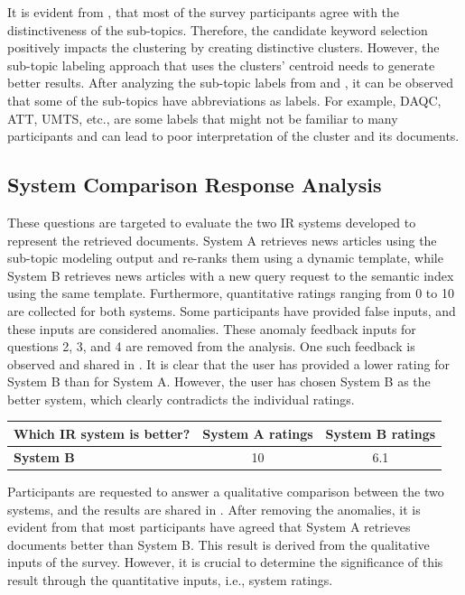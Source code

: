 It is evident from , that most of the survey participants agree with the distinctiveness of the sub-topics. Therefore, the candidate keyword selection positively impacts the clustering by creating distinctive clusters. However, the sub-topic labeling approach that uses the clusters' centroid needs to generate better results. After analyzing the sub-topic labels from  and , it can be observed that some of the sub-topics have abbreviations as labels. For example, DAQC, ATT, UMTS, etc., are some labels that might not be familiar to many participants and can lead to poor interpretation of the cluster and its documents.

\subsection{System Comparison Response Analysis}

These questions are targeted to evaluate the two IR systems developed to represent the retrieved documents. System A retrieves news articles using the sub-topic modeling output and re-ranks them using a dynamic template, while System B retrieves news articles with a new query request to the semantic index using the same template. Furthermore, quantitative ratings ranging from 0 to 10 are collected for both systems. Some participants have provided false inputs, and these inputs are considered anomalies. These anomaly feedback inputs for questions 2, 3, and 4 are removed from the analysis. One such feedback is observed and shared in . It is clear that the user has provided a lower rating for System B than for System A. However, the user has chosen System B as the better system, which clearly contradicts the individual ratings.


 \begin{center}
	\label{tab:question_234_anamoly}
	\begin{tabularx}{.8\textwidth}{|Y|c|c|}
		\hline
		Which IR system is better? & System A ratings & System B ratings \\
		\hline
		\textbf{System B} & 10 & 6.1 \\
		\hline
	\end{tabularx}
\end{center} 

Participants are requested to answer a qualitative comparison between the two systems, and the results are shared in . After removing the anomalies, it is evident from  that most participants have agreed that System A retrieves documents better than System B. This result is derived from the qualitative inputs of the survey. However, it is crucial to determine the significance of this result through the quantitative inputs, i.e., system ratings.\\

